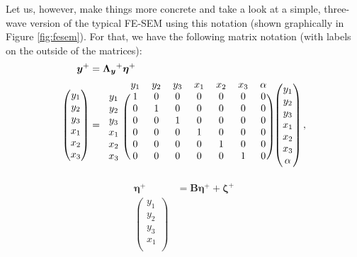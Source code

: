 \documentclass[]{interact}
\theoremstyle{plain}%
\theoremstyle{definition}
\theoremstyle{remark}
\begin{document}
Let us, however, make things more concrete and take a look at a simple,
three-wave version of the typical FE-SEM using this notation (shown
graphically in Figure \ref{fig:fesem}). For that, we have the following
matrix notation (with labels on the outside of the matrices):
\begin{align}
\begin{split}
\bm{y}^{+} & = \bm{\Lambda_{y}}^{+}\bm{\eta}^{+} \\
\begin{pmatrix}
y_{1} \\
y_{2} \\
y_{3} \\
x_{1} \\
x_{2} \\
x_{3}
\end{pmatrix} & = 
\begin{blockarray}{cccccccc}
 & y_{1} & y_{2} & y_{3} & x_{1} & x_{2} & x_{3} & \alpha \\
 \begin{block}{c(ccccccc)}
 y_{1} & 1 & 0 & 0 & 0 & 0 & 0 & 0 \\
 y_{2} & 0 & 1 & 0 & 0 & 0 & 0 & 0 \\
 y_{3} & 0 & 0 & 1 & 0 & 0 & 0 & 0 \\ 
 x_{1} & 0 & 0 & 0 & 1 & 0 & 0 & 0 \\
 x_{2} & 0 & 0 & 0 & 0 & 1 & 0 & 0 \\
 x_{3} & 0 & 0 & 0 & 0 & 0 & 1 & 0 \\
 \end{block}
\end{blockarray}
\begin{pmatrix}
y_{1} \\
y_{2} \\
y_{3} \\
x_{1} \\
x_{2} \\
x_{3} \\
\alpha
\end{pmatrix},
\end{split} \label{eq:y}
\end{align} \begin{align}
\begin{split}
\bm{\eta}^{+} & = \bm{B}\bm{\eta}^{+} + \bm{\zeta}^{+} \\
\begin{pmatrix}
y_{1} \\
y_{2} \\
y_{3} \\
x_{1} \\

\end{pmatrix}
\end{split}
\end{align}
\end{document}
